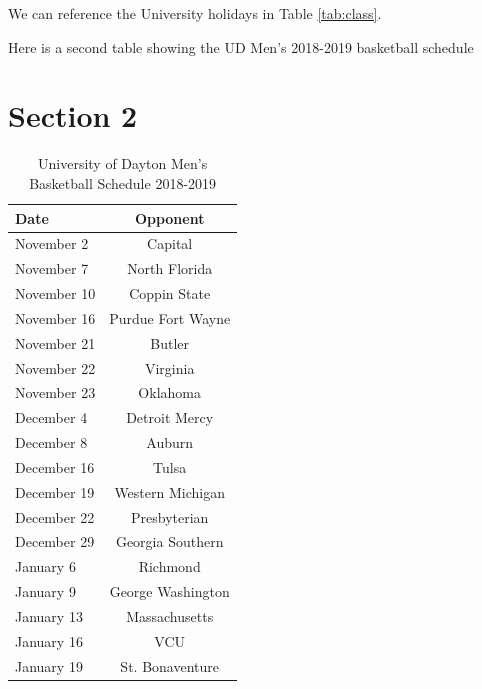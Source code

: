 We can reference the University holidays in Table \ref{tab:class}.

Here is a second table showing the UD Men's 2018-2019 basketball schedule

\section{Section 2}

\begin{table}
    \begin{center}
        \caption{University of Dayton Men's Basketball Schedule 2018-2019}
        \label{tab:bball}
        \begin{tabular}{||l|c||}
            \hline
            Date & Opponent \\
            \hline \hline
            November 2 & Capital \\
            \hline
            November 7 & North Florida \\
            \hline
            November 10 & Coppin State \\
            \hline
            November 16 & Purdue Fort Wayne \\
            \hline
            November 21 & Butler \\
            \hline
            November 22 & Virginia \\
            \hline
            November 23 & Oklahoma \\
            \hline \hline
            December 4 & Detroit Mercy \\
            \hline
            December 8 & Auburn \\
            \hline
            December 16 & Tulsa \\
            \hline
            December 19 & Western Michigan \\
            \hline
            December 22 & Presbyterian \\
            \hline
            December 29 & Georgia Southern \\
            \hline \hline
            January 6 & Richmond \\
            \hline
            January 9 & George Washington \\
            \hline
            January 13 & Massachusetts \\
            \hline
            January 16 & VCU \\
            \hline
            January 19 & St. Bonaventure \\

\end{tabular}
\end{center}
\end{table}
